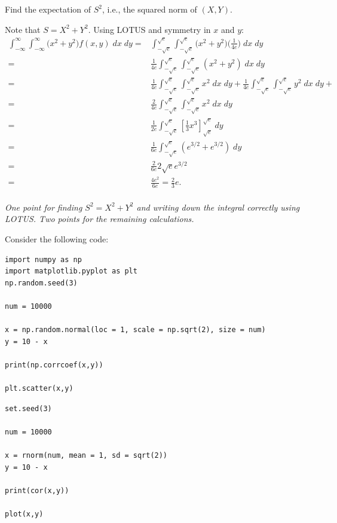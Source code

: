 \begin{exercise}[3]
Find the expectation of $S^2$, i.e., the squared norm of $(X,Y)$.
\begin{solution}
Note that $S = X^2 + Y^2$. Using LOTUS and symmetry in $x$ and $y$:
\begin{align*}
      \int_{-\infty}^\infty \int_{-\infty}^\infty \Big(x^2 + y^2 \Big) f(x,y) \; dx \; dy =& \int_{-\sqrt{e}}^{\sqrt{e}} \int_{-\sqrt{e}}^{\sqrt{e}}  \Big(x^2 + y^2 \Big) \Big(\frac{1}{4e} \Big) \; dx \; dy \\
      =& \frac{1}{4e} \int_{-\sqrt{e}}^{\sqrt{e}} \int_{-\sqrt{e}}^{\sqrt{e}} (x^2 + y^2) \; dx \; dy \\
      =& \frac{1}{4e} \int_{-\sqrt{e}}^{\sqrt{e}} \int_{-\sqrt{e}}^{\sqrt{e}} x^2 \; dx \; dy + \frac{1}{4e} \int_{-\sqrt{e}}^{\sqrt{e}} \int_{-\sqrt{e}}^{\sqrt{e}} y^2 \; dx \; dy + \\
      =& \frac{2}{4e} \int_{-\sqrt{e}}^{\sqrt{e}} \int_{-\sqrt{e}}^{\sqrt{e}} x^2 \; dx \; dy \\
      =& \frac{1}{2e} \int_{-\sqrt{e}}^{\sqrt{e}}  [\frac{1}{3} x^3]_{\sqrt{e}}^{\sqrt{e}} \; dy \\
      =& \frac{1}{6e} \int_{-\sqrt{e}}^{\sqrt{e}} (e^{3/2} + e^{3/2} ) \; dy \\
      =& \frac{2}{6e} 2\sqrt{e} e^{3/2}  \\
      =& \frac{4e^2}{6e} = \frac{2}{3}e.
\end{align*} \\
\textit{One point for finding $S^2 = X^2 + Y^2$ and writing down the integral correctly using LOTUS. Two points for the remaining calculations.}
\end{solution}
\end{exercise}
\noindent
Consider the following code:
\begin{verbatim}
import numpy as np
import matplotlib.pyplot as plt
np.random.seed(3)

num = 10000

x = np.random.normal(loc = 1, scale = np.sqrt(2), size = num)
y = 10 - x

print(np.corrcoef(x,y))

plt.scatter(x,y)
\end{verbatim}

\begin{verbatim}
set.seed(3)

num = 10000

x = rnorm(num, mean = 1, sd = sqrt(2))
y = 10 - x

print(cor(x,y))

plot(x,y)
\end{verbatim}

